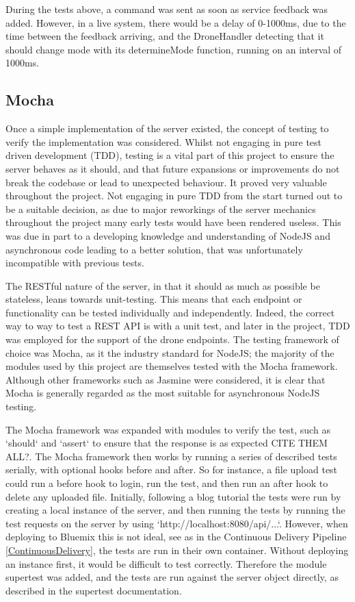 \documentclass{article}
\begin{document}
During the tests above, a command was sent as soon as service feedback was added. However, in a live system, there would be a delay of 0-1000ms, due to the time between the feedback arriving, and the DroneHandler detecting that it should change mode with its determineMode function, running on an interval of 1000ms. 







\subsection{Mocha}
Once a simple implementation of the server existed, the concept of testing to verify the implementation was considered. Whilst not engaging in pure test driven development (TDD), testing is a vital part of this project to ensure the server behaves as it should, and that future expansions or improvements do not break the codebase or lead to unexpected behaviour. It proved very valuable throughout the project. Not engaging in pure TDD from the start turned out to be a suitable decision, as due to major reworkings of the server mechanics throughout the project many early tests would have been rendered useless. This was due in part to a developing knowledge and understanding of NodeJS and asynchronous code leading to a better solution, that was unfortunately incompatible with previous tests. 

The RESTful nature of the server, in that it should as much as possible be stateless, leans towards unit-testing. This means that each endpoint or functionality can be tested individually and independently. Indeed, the correct way to way to test a REST API is with a unit test\cite{mardan2014tdd}, and later in the project, TDD was employed for the support of the drone endpoints. The testing framework of choice was Mocha, as it the industry standard for NodeJS; the majority of the modules used by this project are themselves tested with the Mocha framework. Although other frameworks such as Jasmine\cite{jasmine} were considered, it is clear that Mocha is generally regarded as the most suitable for asynchronous NodeJS testing\cite{testingReview}. 

The Mocha framework was expanded with modules to verify the test, such as `should` and `assert` to ensure that the response is as expected CITE THEM ALL?. The Mocha framework then works by running a series of described tests serially, with optional hooks before and after. So for instance, a file upload test could run a before hook to login, run the test, and then run an after hook to delete any uploaded file. Initially, following a blog tutorial\cite{thewayofcode} the tests were run by creating a local instance of the server, and then running the tests by running the test requests on the server by using `http://localhost:8080/api/...`. However, when deploying to Bluemix this is not ideal, see as in the Continuous Delivery Pipeline \ref{ContinuousDelivery}, the tests are run in their own container. Without deploying an instance first, it would be difficult to test correctly. Therefore the module supertest was added, and the tests are run against the server object directly, as described in the supertest documentation\cite{supertest}.
\end{document}
